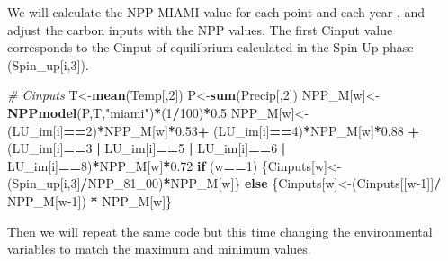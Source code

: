 \documentclass[
  10pt,
  b5paper,
]{book}
\newenvironment{Shaded}{\begin{snugshade}}{\end{snugshade}}
\newcommand{\CommentTok}[1]{\textcolor[rgb]{0.56,0.35,0.01}{\textit{#1}}}
\newcommand{\ControlFlowTok}[1]{\textcolor[rgb]{0.13,0.29,0.53}{\textbf{#1}}}
\newcommand{\DecValTok}[1]{\textcolor[rgb]{0.00,0.00,0.81}{#1}}
\newcommand{\FloatTok}[1]{\textcolor[rgb]{0.00,0.00,0.81}{#1}}
\newcommand{\KeywordTok}[1]{\textcolor[rgb]{0.13,0.29,0.53}{\textbf{#1}}}
\newcommand{\NormalTok}[1]{#1}
\newcommand{\OperatorTok}[1]{\textcolor[rgb]{0.81,0.36,0.00}{\textbf{#1}}}
\newcommand{\StringTok}[1]{\textcolor[rgb]{0.31,0.60,0.02}{#1}}
\begin{document}
We will calculate the NPP MIAMI value for each point and each year , and adjust the carbon inputs with the NPP values. The first Cinput value corresponds to the Cinput of equilibrium calculated in the Spin Up phase (Spin\_up{[}i,3{]}).

\begin{Shaded}
\begin{Highlighting}[]
\CommentTok{# Cinputs }
\NormalTok{T<-}\KeywordTok{mean}\NormalTok{(Temp[,}\DecValTok{2}\NormalTok{])}
\NormalTok{P<-}\KeywordTok{sum}\NormalTok{(Precip[,}\DecValTok{2}\NormalTok{])}
\NormalTok{NPP_M[w]<-}\KeywordTok{NPPmodel}\NormalTok{(P,T,}\StringTok{"miami"}\NormalTok{)}\OperatorTok{*}\NormalTok{(}\DecValTok{1}\OperatorTok{/}\DecValTok{100}\NormalTok{)}\OperatorTok{*}\FloatTok{0.5}
\NormalTok{NPP_M[w]<-(LU_im[i]}\OperatorTok{==}\DecValTok{2}\NormalTok{)}\OperatorTok{*}\NormalTok{NPP_M[w]}\OperatorTok{*}\FloatTok{0.53}\OperatorTok{+}\StringTok{ }\NormalTok{(LU_im[i]}\OperatorTok{==}\DecValTok{4}\NormalTok{)}\OperatorTok{*}\NormalTok{NPP_M[w]}\OperatorTok{*}\FloatTok{0.88} \OperatorTok{+}\StringTok{ }\NormalTok{(LU_im[i]}\OperatorTok{==}\DecValTok{3} \OperatorTok{|}\StringTok{ }\NormalTok{LU_im[i]}\OperatorTok{==}\DecValTok{5} \OperatorTok{|}\StringTok{ }\NormalTok{LU_im[i]}\OperatorTok{==}\DecValTok{6} \OperatorTok{|}\StringTok{ }\NormalTok{LU_im[i]}\OperatorTok{==}\DecValTok{8}\NormalTok{)}\OperatorTok{*}\NormalTok{NPP_M[w]}\OperatorTok{*}\FloatTok{0.72}
\ControlFlowTok{if}\NormalTok{ (w}\OperatorTok{==}\DecValTok{1}\NormalTok{) \{Cinputs[w]<-(Spin_up[i,}\DecValTok{3}\NormalTok{]}\OperatorTok{/}\NormalTok{NPP_}\DecValTok{81}\NormalTok{_}\DecValTok{00}\NormalTok{)}\OperatorTok{*}\NormalTok{NPP_M[w]\} }\ControlFlowTok{else}\NormalTok{ \{Cinputs[w]<-(Cinputs[[w}\DecValTok{-1}\NormalTok{]]}\OperatorTok{/}\StringTok{ }\NormalTok{NPP_M[w}\DecValTok{-1}\NormalTok{]) }\OperatorTok{*}\StringTok{ }\NormalTok{NPP_M[w]\} }
\end{Highlighting}
\end{Shaded}

Then we will repeat the same code but this time changing the environmental variables to match the maximum and minimum values.
\end{document}
